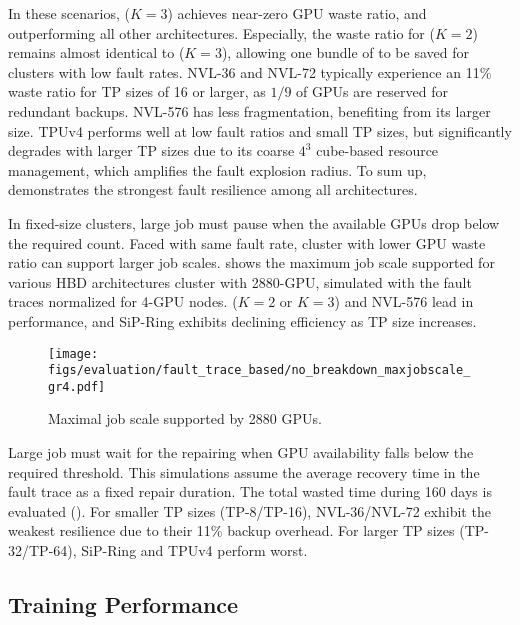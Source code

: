 In these scenarios, \sys{} ($K=3$) achieves near-zero GPU waste ratio, and outperforming all other architectures. Especially, the waste ratio for \sys ($K=2$) remains almost identical to \sys{} ($K=3$), allowing one bundle of \docs{} to be saved for clusters with low fault rates.   
NVL-36 and NVL-72 typically experience an 11\% waste ratio for TP sizes of 16 or larger, as $1/9$ of GPUs are reserved for redundant backups. NVL-576 has less fragmentation, benefiting from its larger size. TPUv4 performs well at low fault ratios and small TP sizes, but significantly degrades with larger TP sizes due to its coarse $4^3$ cube-based resource management, which amplifies the fault explosion radius. To sum up, \sys{} demonstrates the strongest fault resilience among all architectures.   



In fixed-size clusters, large job must pause when the available GPUs drop below the required count. Faced with same fault rate, cluster with lower GPU waste ratio can support larger job scales.  shows the maximum job scale supported for various HBD architectures cluster with 2880-GPU, simulated with the fault traces normalized for 4-GPU nodes. \sys{} ($K=2$ or $K=3$) and NVL-576 lead in performance, and SiP-Ring exhibits declining efficiency as TP size increases.


\begin{figure}[h!t]
    \centering
        \texttt{[image: figs/evaluation/fault\_trace\_based/no\_breakdown\_maxjobscale\_gr4.pdf]}
    \vspace{-2ex}
    \caption{Maximal job scale supported by 2880 GPUs.}
    \label{fig:simulation:job_scale}
    \vspace{-1em}
\end{figure}


 Large job must wait for the repairing when GPU availability falls below the required threshold. This simulations assume the average recovery time in the fault trace as a fixed repair duration. The total wasted time during 160 days is evaluated (). For smaller TP sizes (TP-8/TP-16), NVL-36/NVL-72 exhibit the weakest resilience due to their 11\% backup overhead. For larger TP sizes (TP-32/TP-64), SiP-Ring and TPUv4 perform worst. 


\vspace{-1ex}
\subsection{Training Performance}
\label{sec:simulation:end2end}

